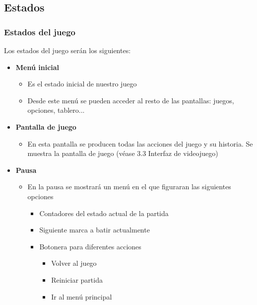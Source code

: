 \documentclass[palatino]{apuntes}
\begin{document}
\subsection{Estados}

\subsubsection{Estados del juego}
Los estados del juego serán los siguientes:

\begin{itemize}
    \item \textbf{Menú inicial}
        \begin{itemize}
            \item Es el estado inicial de nuestro juego
            \item Desde este menú se pueden acceder al resto de las pantallas: juegos, opciones, tablero...
        \end{itemize}
    \item \textbf{Pantalla de juego}
        \begin{itemize}
            \item En esta pantalla se producen todas las acciones del juego y su historia. Se muestra la pantalla de juego (véase 3.3 Interfaz de videojuego)
        \end{itemize}
    \item \textbf{Pausa}
        \begin{itemize}
            \item En la pausa se mostrará un menú en el que figuraran las siguientes opciones
                \begin{itemize}
                    \item Contadores del estado actual de la partida
                    \item Siguiente marca a batir actualmente
                    \item Botonera para diferentes acciones 
                         \begin{itemize}
                            \item Volver al juego
                            \item Reiniciar partida
                            \item Ir al menú principal
                        \end{itemize}
                \end{itemize}
        \end{itemize}

\end{itemize}
\end{document}
